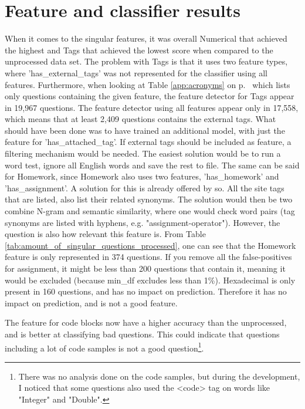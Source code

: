 \section{Feature and classifier results}
\label{sec:feature_classifier_results}
When it comes to the singular features, it was overall Numerical that achieved the highest and Tags that achieved the lowest score when compared to the unprocessed data set.
The problem with Tags is that it uses two feature types, where 'has\_external\_tags' was not represented for the classifier using all features.
Furthermore, when looking at Table \ref{app:acronyms} on p.~\pageref{app:acronyms} which lists only questions containing the given feature, the feature detector for Tags appear in 19,967 questions.
The feature detector using all features appear only in 17,558, which means that at least 2,409 questions contains the external tags.
What should have been done was to have trained an additional model, with just the feature for 'has\_attached\_tag'.
If external tags should be included as feature, a filtering mechanism would be needed.
The easiest solution would be to run a word test, ignore all English words and save the rest to file.
\vspace{0.5em}\newline
The same can be said for Homework, since Homework also uses two features, 'has\_homework' and 'has\_assignment'.
A solution for this is already offered by \gls{so}.
All the site tags that are listed, also list their related synonyms.
The solution would then be two combine N-gram and semantic similarity, where one would check word pairs (tag synonyms are listed with hyphens, e.g. "assignment-operator").
However, the question is also how relevant this feature is. 
From Table \ref{tab:amount_of_singular_questions_processed}, one can see that the Homework feature is only represented in 374 questions.
If you remove all the false-positives for assignment, it might be less than 200 questions that contain it, meaning it would be excluded (because min\_df excludes less than 1\%).
\vspace{0.5em}\newline
Hexadecimal is only present in 160 questions, and has no impact on prediction. 
Therefore it has no impact on prediction, and is not a good feature. 
\vspace{0.5em}\newline


The feature for code blocks now have a higher accuracy than the unprocessed, and is better at classifying bad questions. 
This could indicate that questions including a lot of code samples is not a good question\footnote{
	There was no analysis done on the code samples, but during the development, I noticed that some questions also used the <code> tag on words like "Integer" and "Double".
}.




